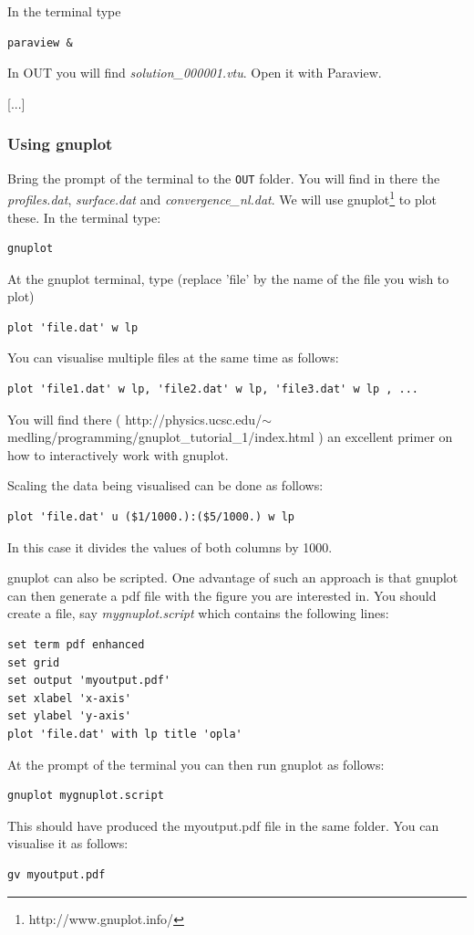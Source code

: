 In the terminal type
\begin{verbatim}
paraview &
\end{verbatim}
In OUT you will find {\sl solution\_000001.vtu}. Open it with Paraview.

[...]

\subsubsection*{Using gnuplot}

Bring the prompt of the terminal to the {\tt OUT} folder. You will find in there the 
{\sl profiles.dat}, {\sl surface.dat} and {\sl convergence\_nl.dat}.
We will use gnuplot\footnote{http://www.gnuplot.info/} to plot these. In the terminal type:
\begin{verbatim}
gnuplot
\end{verbatim}
At the gnuplot terminal, type (replace 'file' by the name of the file you wish to plot)
\begin{verbatim}
plot 'file.dat' w lp 
\end{verbatim}

You can visualise multiple files at the same time as follows:
\begin{verbatim}
plot 'file1.dat' w lp, 'file2.dat' w lp, 'file3.dat' w lp , ... 
\end{verbatim}
You will find there ( http://physics.ucsc.edu/$\sim$medling/programming/gnuplot\_tutorial\_1/index.html ) 
an excellent primer on how to interactively work with gnuplot.

Scaling the data being visualised can be done as follows:
\begin{verbatim}
plot 'file.dat' u ($1/1000.):($5/1000.) w lp
\end{verbatim}
In this case it divides the values of both columns by 1000.

gnuplot can also be scripted. One advantage of such an approach is that gnuplot can then generate a pdf 
file with the figure you are interested in. You should create a file, say {\sl mygnuplot.script} which contains the following lines:
\begin{verbatim}
set term pdf enhanced
set grid
set output 'myoutput.pdf'
set xlabel 'x-axis'
set ylabel 'y-axis'
plot 'file.dat' with lp title 'opla'
\end{verbatim}

At the prompt of the terminal you can then run gnuplot as follows:
\begin{verbatim}
gnuplot mygnuplot.script
\end{verbatim}
This should have produced the myoutput.pdf file in the same folder.
You can visualise it as follows:
\begin{verbatim}
gv myoutput.pdf
\end{verbatim}

